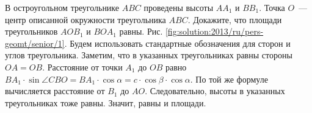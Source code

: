 \problem
В остроугольном треугольнике $ABC$ проведены высоты $A A_1$ и $B B_1$.
Точка $O$~--- центр описанной окружности треугольника $ABC$.
Докажите, что площади треугольников $A O B_1$ и $B O A_1$ равны.
%
\label{solution:2013/ru/pers-geomt/senior/1}
Рис. \ref{fig:solution:2013/ru/pers-geomt/senior/1}.
Будем использовать стандартные обозначения для сторон и углов треугольника.
Заметим, что в указанных треугольниках равны стороны $OA = OB$.
Расстояние от точки $A_1$ до $OB$ равно
\(
    B A_1 \cdot \sin \angle CBO
=
    B A_1 \cdot \cos \alpha
=
    c \cdot \cos \beta \cdot \cos \alpha
\).
По той же формуле вычисляется расстояние от $B_1$ до $AO$.
Следовательно, высоты в указанных треугольниках тоже равны.
Значит, равны и площади.
\endproblem
